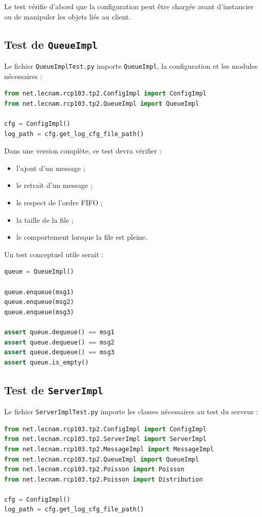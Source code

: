 \documentclass{article}
\begin{document}
Le test vérifie d’abord que la configuration peut être chargée avant d’instancier ou de manipuler les objets liés au client.

\subsection{Test de \texttt{QueueImpl}}

Le fichier \texttt{QueueImplTest.py} importe \texttt{QueueImpl}, la configuration et les modules nécessaires :

\begin{lstlisting}[language=Python, caption=Extrait de QueueImplTest.py]
from net.lecnam.rcp103.tp2.ConfigImpl import ConfigImpl
from net.lecnam.rcp103.tp2.QueueImpl import QueueImpl

cfg = ConfigImpl()
log_path = cfg.get_log_cfg_file_path()
\end{lstlisting}

Dans une version complète, ce test devra vérifier :
\begin{itemize}[leftmargin=*]
    \item l’ajout d’un message ;
    \item le retrait d’un message ;
    \item le respect de l’ordre FIFO ;
    \item la taille de la file ;
    \item le comportement lorsque la file est pleine.
\end{itemize}

Un test conceptuel utile serait :

\begin{lstlisting}[language=Python, caption=Test conceptuel du comportement FIFO]
queue = QueueImpl()

queue.enqueue(msg1)
queue.enqueue(msg2)
queue.enqueue(msg3)

assert queue.dequeue() == msg1
assert queue.dequeue() == msg2
assert queue.dequeue() == msg3
assert queue.is_empty()
\end{lstlisting}

\subsection{Test de \texttt{ServerImpl}}

Le fichier \texttt{ServerImplTest.py} importe les classes nécessaires au test du serveur :

\begin{lstlisting}[language=Python, caption=Extrait de ServerImplTest.py]
from net.lecnam.rcp103.tp2.ConfigImpl import ConfigImpl
from net.lecnam.rcp103.tp2.ServerImpl import ServerImpl
from net.lecnam.rcp103.tp2.MessageImpl import MessageImpl
from net.lecnam.rcp103.tp2.QueueImpl import QueueImpl
from net.lecnam.rcp103.tp2.Poisson import Poisson
from net.lecnam.rcp103.tp2.Poisson import Distribution

cfg = ConfigImpl()
log_path = cfg.get_log_cfg_file_path()
\end{lstlisting}
\end{document}
